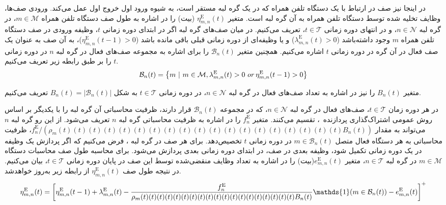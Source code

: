 

در اینجا نیز صف در ارتباط با یک دستگاه تلفن همراه که در یک گره لبه مستقر است، به شیوه ورود اول خروج اول عمل می‌کند. ورودی صف‌ها، وظایف تخلیه شده توسط دستگاه تلفن همراه به آن گره لبه است. متغیر $\eta_{m,n}^{\text{E}}(t)$ (بیت) را در اشاره به طول صف دستگاه تلفن همراه $m \in \mathcal{M}$، در گره لبه $n \in \mathcal{N}$، و در انتهای دوره زمانی $t \in \mathcal{T}$، تعریف می‌کنیم. در میان صف‌های گره لبه اگر در ابتدای دوره زمانی $t$، وظیفه ورودی در صف دستگاه تلفن همراه $m$ وجود داشته‌باشد ($\lambda_{m,n}^{\text{E}}(t)>0$) و یا وظیفه‌ای از دوره زمانی قبلی باقی مانده باشد ($\eta_{m,n}^{\text{E}}(t-1)>0$)، به آن صف به عنوان یک صف فعال در آن گره در دوره زمانی $t$ اشاره می‌کنیم. همچنین متغیر $\mathcal{B}_n(t)$ را برای اشاره به مجموعه صف‌های فعال در گره لبه $n$ در دوره زمانی $t$ را بر طبق رابطه زیر تعریف می‌کنیم.
\begin{alignat}{2}
	\mathcal{B}_n(t) = \left\{ m \ | \ m \in \mathcal{M}, \lambda_{m,n}^{\text{E}}(t)>0 \ or \,  \eta_{m,n}^{\text{E}}(t-1)>0 \right\}
	\label{110}  
\end{alignat}


متغیر $B_n(t)$ را نیز در اشاره به تعداد صف‌های فعال در گره لبه $n \in \mathcal{N}$، در دوره زمانی $t \in \mathcal{T}$ به شکل $B_n(t)=|\mathcal{B}_n(t)|$ تعریف می‌کنیم. 

در هر دوره زمان $t \in \mathcal{T}$، صف‌های فعال در گره لبه $n \in \mathcal{N}$، که در مجموعه $\mathcal{B}_n(t)$ قرار دارند، ظرفیت محاسباتی آن گره لبه را با یکدیگر بر اساس روش عمومی اشتراک‌گذاری پردازنده~\cite{parekh1993generalized}، تقسیم می‌کنند. متغیر $f_n^{\text{E}}$ را در اشاره به ظرفیت محاسباتی گره لبه $n$ تعریف می‌شود. از این رو گره لبه $n$ می‌تواند به مقدار $f_n^{\text{E}}/(\rho_m(t)(t)(t)(t)(t)(t)(t)(t)(t)(t)(t)(t)(t)(t)(t)(t)(t)(t)(t) B_n(t))$، ظرفیت محاسباتی به هر دستگاه فعال متصل $m \in \mathcal{B}_n(t)$ در دوره زمانی $t$ تخصیص‌دهد.
برای هر صف در گره لبه ، فرض می‌کنیم که اگر
پردازش یک وظیفه در یک دوره زمانی تکمیل شود، وظیفه بعدی در صف، در ابتدای دوره زمانی بعدی پردازش می‌شود. برای محاسبه طول صف محاسبات دستگاه $m \in \mathcal{M}$ در گره لبه $n \in \mathcal{T}$، متغیر $e_{m,n}^{\text{E}}(t)$(بیت) را در اشاره به تعداد وظایف منقضی‌شده توسط این صف در پایان دوره زمانی $t \in \mathcal{T}$، بیان می‌کنیم. در نتیجه طول  صف $\eta_{m,n}^{\text{E}}(t)$ از رابطه زیر به‌روز خواهدشد.  
\begin{alignat}{2}
	\eta_{m,n}^{\text{E}}(t)= 
	\left[\eta_{m,n}^{\text{E}}(t-1) + \lambda_{m,n}^{\text{E}}(t) - {f_n^{\text{E}}\over \rho_m(t)(t)(t)(t)(t)(t)(t)(t)(t)(t)(t)(t)(t)(t)(t)(t)(t)(t)(t)B_n(t)}\mathds{1}(m \in \mathcal{B}_n(t)) - e_{m,n}^{\text{E}}(t)\right]^+
	\label{111}  
\end{alignat}


